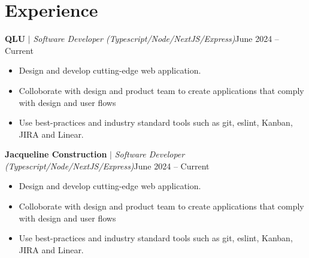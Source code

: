 
\section{Experience}
  \resumeSubHeadingListStart

          
          \resumeProjectHeading
          {\textbf{QLU}\vspace{8pt} $|$ \footnotesize\emph{Software Developer (Typescript/Node/NextJS/Express)}}{June 2024 -- Current}
            \begin{itemize}
              \item 
              Design and develop cutting-edge web application. 
              \item 
              Colloborate with design and product team to create applications that comply with design and user flows
              \item 
              Use best-practices and industry standard tools such as git, eslint, Kanban, JIRA and Linear. 
          \end{itemize}

          \resumeProjectHeading
          {\textbf{Jacqueline Construction}\vspace{8pt} $|$ \footnotesize\emph{Software Developer (Typescript/Node/NextJS/Express)}}{June 2024 -- Current}
            \begin{itemize}
              \item 
              Design and develop cutting-edge web application. 
              \item 
              Colloborate with design and product team to create applications that comply with design and user flows
              \item 
              Use best-practices and industry standard tools such as git, eslint, Kanban, JIRA and Linear. 
          \end{itemize}

